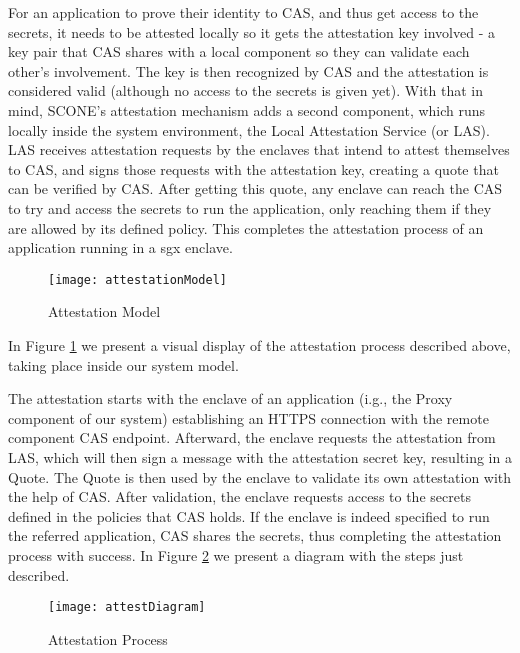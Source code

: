 For an application to prove their identity to CAS, and thus get access to the secrets, it needs to be attested locally so it gets the attestation key involved - a key pair that CAS shares with a local component so they can validate each other's involvement. The key is then recognized by CAS and the attestation is considered valid (although no access to the secrets is given yet). With that in mind, SCONE's attestation mechanism adds a second component, which runs locally inside the system environment, the Local Attestation Service (or LAS). LAS receives attestation requests by the enclaves that intend to attest themselves to CAS, and signs those requests with the attestation key, creating a quote that can be verified by CAS. After getting this quote, any enclave can reach the CAS to try and access the secrets to run the application, only reaching them if they are allowed by its defined policy. This completes the attestation process of an application running in a \gls{sgx} enclave. 
\vspace{3mm}

\begin{figure}[htbp]
	\centering
	{\texttt{[image: attestationModel]}}
	\caption{Attestation Model}
	\label{fig:attestationModel}
\end{figure}

In Figure \ref{fig:attestationModel} we present a visual display of the attestation process described above, taking place inside our system model.

The attestation starts with the enclave of an application (i.g., the Proxy component of our system) establishing an HTTPS connection with the remote component CAS endpoint. Afterward, the enclave requests the attestation from LAS, which will then sign a message with the attestation secret key, resulting in a Quote. The Quote is then used by the enclave to validate its own attestation with the help of CAS. After validation, the enclave requests access to the secrets defined in the policies that CAS holds. If the enclave is indeed specified to run the referred application, CAS shares the secrets, thus completing the attestation process with success. In Figure \ref{fig:attestationProcess} we present a diagram with the steps just described.

\begin{figure}[htbp]
	\centering
	{\texttt{[image: attestDiagram]}}
	\caption{Attestation Process}
	\label{fig:attestationProcess}
\end{figure}


